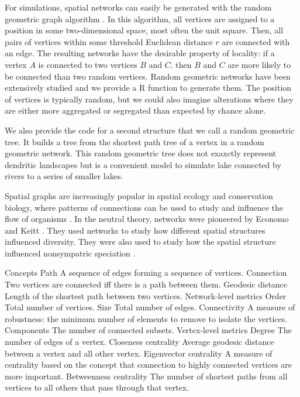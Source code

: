 \documentclass[12pt]{article}
\begin{document}
For simulations, spatial networks can easily be generated with the random
geometric graph algorithm \cite{sed01}. In this algorithm, all vertices are
assigned to a position in some two-dimensional space, most often the unit
square. Then, all pairs of vertices within some threshold Euclidean distance $r$
are connected with an edge. The resulting networks have the desirable
property of locality: if a vertex $A$ is connected to two vertices $B$ and $C$.
then $B$ and $C$ are more likely to be connected than two random vertices.
Random geometric networks have been extensively studied \cite{app97a,app97
b,app02a,app02b,pen03} and we provide a R function to generate them. The 
position of vertices is typically random, but we could also imagine alterations
where they are either more aggregated or segregated than expected by chance alone. 

We also provide the code for a second structure that we call a random geometric tree. 
It builds a tree from the shortest path tree \cite{dij59} of a vertex in a random geometric 
network. This random geometric tree does not exaxctly represent dendritic landscapes 
but is a convenient model to simulate lake connected by rivers to a series of smaller lakes.

Spatial graphs are increasingly popular in spatial ecology and conservation
biology, where patterns of connections can be used to study and influence the
flow of organisms \cite{min07,fal07,min08,gar08,urb09,dal10}. In the neutral
theory, networks were pioneered by Economo and Keitt \cite{eco08, eco10}.
They used networks to study how different spatial structures influenced
diversity. They were also used to study how the spatial structure influenced
nonsympatric speciation \cite{des12,des12b}.


Concepts
  Path A sequence of edges forming a sequence of vertices.
  Connection Two vertices are connected iff there is a path between them.
  Geodesic distance Length of the shortest path between two vertices.
Network-level metrics
  Order Total number of vertices.
  Size Total number of edges.
  Connectivity A measure of robustness: the minimum number of elements to remove
                          to isolate the vertices.
  Components The number of connected subsets.
Vertex-level metrics
  Degree The number of edges of a vertex.
  Closeness centrality Average geodesic distance between a vertex and all other vertex.
  Eigenvector centrality A measure of centrality based on the concept that connection to
                          highly connected vertices are more important.
  Betweenness centrality The number of shortest paths from all vertices to all others that
                          pass through that vertex.
\end{document}

